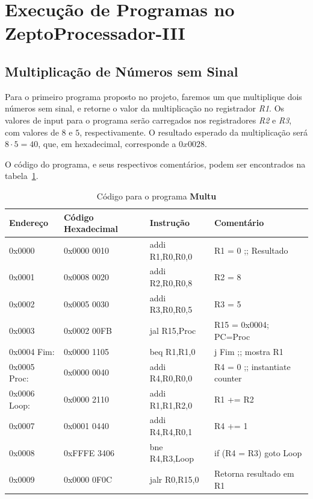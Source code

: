 \documentclass[12pt]{article}
\begin{document}
\section{Execução de Programas no ZeptoProcessador-III}\label{sec:programs}

\subsection{Multiplicação de Números sem Sinal}\label{sec:programs:multu}

Para o primeiro programa proposto no projeto, faremos um que multiplique dois
números sem sinal, e retorne o valor da multiplicação no registrador \emph{R1}.
Os valores de input para o programa serão carregados nos registradores \emph{R2}
e \emph{R3}, com valores de $8$ e $5$, respectivamente. O resultado esperado da
multiplicação será $8 \cdot 5 = 40$, que, em hexadecimal, corresponde a
$0x0028$.

O código do programa, e seus respectivos comentários, podem ser encontrados na
tabela~\ref{tab:programs:multu}.

\begin{table}[H]
    \centering
    \caption{Código para o programa \textbf{Multu}}
    \begin{tabular}{|l|l|l|l|}\hline
        \textbf{Endereço} & \textbf{Código Hexadecimal} & \textbf{Instrução} & \textbf{Comentário} \\\hline
        0x0000       & 0x0000 0010 & addi R1,R0,R0,0 & R1 = 0 ;; Resultado           \\\hline
        0x0001       & 0x0008 0020 & addi R2,R0,R0,8 & R2 = 8                        \\\hline
        0x0002       & 0x0005 0030 & addi R3,R0,R0,5 & R3 = 5                        \\\hline
        0x0003       & 0x0002 00FB & jal R15,Proc    & R15 = 0x0004; PC=Proc         \\\hline
        0x0004 Fim:  & 0x0000 1105 & beq R1,R1,0     & j Fim ;; mostra R1            \\\hline
        0x0005 Proc: & 0x0000 0040 & addi R4,R0,R0,0 & R4 = 0 ;; instantiate counter \\\hline
        0x0006 Loop: & 0x0000 2110 & addi R1,R1,R2,0 & R1 += R2                      \\\hline
        0x0007       & 0x0001 0440 & addi R4,R4,R0,1 & R4 += 1                       \\\hline
        0x0008       & 0xFFFE 3406 & bne  R4,R3,Loop & if (R4 \!= R3) goto Loop      \\\hline
        0x0009       & 0x0000 0F0C & jalr R0,R15,0   & Retorna resultado em R1       \\\hline
    \end{tabular}\label{tab:programs:multu}
\end{table}
\end{document}
